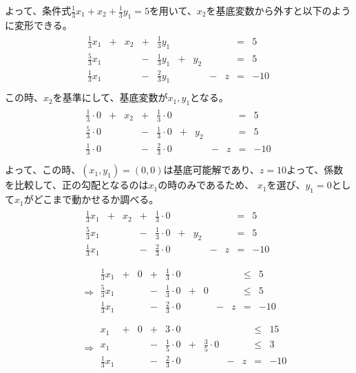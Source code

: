\documentclass[dvipdfmx,titlepage, a4paper]{jsarticle}%
\begin{document}
よって、条件式$\frac{1}{3}x_{1} + x_{2} + \frac{1}{3}y_{1} = 5$を用いて、$x_{2}$を基底変数から外すと以下のように変形できる。
\begin{eqnarray*}
	\begin{array}{lllllllllll}
		\frac{1}{3}x_{1} & + & x_{2} & + & \frac{1}{3} y_{1} & \;& \; &\; & \; & = & 5\\
		\frac{5}{3}x_{1} & \; & \; & - & \frac{1}{3}y_{1} & + & y_{2} &\; & \; & = & 5\\
		\frac{1}{3}x_{1} & \; & \; & - & \frac{2}{3}y_{1} & \;& \; & - & z & = & -10\\
	\end{array}
\end{eqnarray*}
この時、$x_{2}$を基準にして、基底変数が$x_{1}, y_{1}$となる。
\begin{eqnarray*}
	\begin{array}{lllllllllll}
		\frac{1}{3} \cdot 0 & + & x_{2} & + & \frac{1}{3} \cdot 0 & \;& \; &\; & \; & = & 5\\
		\frac{5}{3} \cdot 0 & \; & \; & - & \frac{1}{3} \cdot 0 & + & y_{2} &\; & \; & = & 5\\
		\frac{1}{3} \cdot 0 & \; & \; & - & \frac{2}{3} \cdot 0 & \;& \; & - & z & = & -10\\
	\end{array}
\end{eqnarray*}
よって、この時、$(x_{1}, y_{1}) = (0, 0)$は基底可能解であり、$z=10$よって、係数を比較して、正の勾配となるのは$x_{1}$の時のみであるため、
$x_{1}$を選び、$y_{1} = 0$として$x_{1}$がどこまで動かせるか調べる。
\begin{eqnarray*}
	&&\begin{array}{lllllllllll}
		\frac{1}{3}x_{1} & + & x_{2} & + & \frac{1}{3}\cdot 0 & \;& \; &\; & \; & = & 5\\
		\frac{5}{3}x_{1} & \; & \; & - & \frac{1}{3}\cdot 0 & + & y_{2} &\; & \; & = & 5\\
		\frac{1}{3}x_{1} & \; & \; & - & \frac{2}{3}\cdot 0 & \;& \; & - & z & = & -10\\
	\end{array}\\
	&&\Longrightarrow
	\begin{array}{lllllllllll}
		\frac{1}{3}x_{1} & + & 0 & + & \frac{1}{3}\cdot 0 & \;& \; &\; & \; & \leq & 5\\
		\frac{5}{3}x_{1} & \; & \; & - & \frac{1}{3}\cdot 0 & + & 0 &\; & \; & \leq & 5\\
		\frac{1}{3}x_{1} & \; & \; & - & \frac{2}{3}\cdot 0 & \;& \; & - & z & = & -10\\
	\end{array}\\
	&&\Longrightarrow
	\begin{array}{lllllllllll}
		x_{1} & + & 0 & + & 3\cdot 0 & \;& \; &\; & \; & \leq & 15\\
		x_{1} & \; & \; & - & \frac{1}{5}\cdot 0 & + & \frac{3}{5}\cdot 0 &\; & \; & \leq & 3\\
		\frac{1}{3}x_{1} & \; & \; & - & \frac{2}{3}\cdot 0 & \;& \; & - & z & = & -10\\
	\end{array}
\end{eqnarray*}
\end{document}
